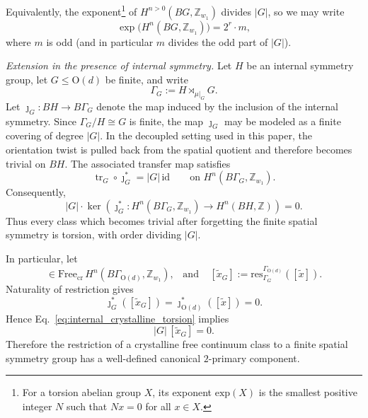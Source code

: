 \documentclass[aps,prx,reprint,superscriptaddress,twocolumn,amsmath,amssymb,amsfonts, nofootinbib]{revtex4-2}
\newcommand{\res}{\text{res}}
\theoremstyle{apsstyle}
\begin{document}
\bigskip 

\noindent Equivalently, the exponent\footnote{For a torsion abelian group $X$, its exponent $\mathrm{exp}(X)$ is the smallest positive integer $N$ such that $Nx=0$ for all $x\in X$.} of $H^{n>0}(BG,\mathbb{Z}_{w_1})$ divides $|G|$, so we may write
\begin{equation}
    \exp\big(H^{n}(BG,\mathbb{Z}_{w_1})\big)=2^r \cdot m,
\end{equation}
where $m$ is odd (and in particular $m$ divides the odd part of $|G|$).


\noindent \textit{Extension in the presence of internal symmetry.}
Let $H$ be an internal symmetry group, let
$G\leq\mathrm O(d)$ be finite, and write
\begin{equation*}
\Gamma_G:=H\rtimes_{\mu|_G}G.
\end{equation*}
Let
$\jmath_G:BH\to B\Gamma_G$
denote the map induced by the inclusion of the internal symmetry.
Since $\Gamma_G/H\cong G$ is finite, the map $\jmath_G$ may be
modeled as a finite covering of degree $|G|$. In the decoupled setting
used in this paper, the orientation twist is pulled back from the
spatial quotient and therefore becomes trivial on $BH$. The associated
transfer map satisfies
\begin{equation}
\operatorname{tr}_G\circ\jmath_G^*
=
|G|\,\mathrm{id}
\qquad
\text{on }
H^n(B\Gamma_G,\mathbb Z_{w_1}).
\label{eq:internal_res_cores}
\end{equation}
Consequently,
\begin{equation}
|G|\cdot
\ker\left(
\jmath_G^*:
H^n(B\Gamma_G,\mathbb Z_{w_1})
\longrightarrow
H^n(BH,\mathbb Z)
\right)
=
0.
\label{eq:internal_crystalline_torsion}
\end{equation}
Thus every class which becomes trivial after forgetting the finite
spatial symmetry is torsion, with order dividing $|G|$.

\medskip 

\noindent In particular, let
\begin{equation*}
[\widetilde x]
\in
\mathrm{Free}_{\mathrm{cr}}\,
H^n(B\Gamma_{\mathrm O(d)},\mathbb Z_{w_1}), \;\;\;\text{and}\;\;\;\;
[\widetilde x_G]
:=
\res^{\Gamma_{\mathrm O(d)}}_{\Gamma_G}
([\widetilde x]).
\end{equation*}
Naturality of restriction gives
\begin{equation*}
\jmath_G^*([\widetilde x_G]) =
\jmath_{\mathrm O(d)}^*([\widetilde x]) = 0.
\end{equation*}
Hence Eq.~\eqref{eq:internal_crystalline_torsion} implies
\begin{equation}
|G|\,[\widetilde x_G]=0.
\label{eq:free_class_finite_restriction_torsion}
\end{equation}
Therefore the restriction of a crystalline free continuum class to a
finite spatial symmetry group has a well-defined canonical
$2$-primary component.
\end{document}
